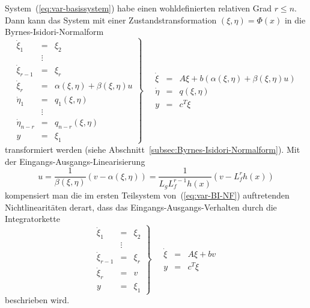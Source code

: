 System~(\ref{eq:var-basissystem}) habe einen wohldefinierten relativen
Grad $r\leq n$. Dann kann das System mit einer Zustandstransformation
$(\xi,\eta)=\Phi(x)$ in die Byrnes-Isidori-Normalform
\begin{equation}
\left.\begin{array}{lcl}
\dot{\xi}_{1} & = & \xi_{2}\\
 & \vdots\\
\dot{\xi}_{r-1} & = & \xi_{r}\\
\dot{\xi}_{r} & = & \alpha(\xi,\eta)+\beta(\xi,\eta)u\\
\dot{\eta}_{1} & = & q_{1}(\xi,\eta)\\
 & \vdots\\
\dot{\eta}_{n-r} & = & q_{n-r}(\xi,\eta)\\
y & = & \xi_{1}
\end{array}\right\} \quad\begin{array}{rcl}
\dot{\xi} & = & A\xi+b(\alpha(\xi,\eta)+\beta(\xi,\eta)u)\\
\dot{\eta} & = & q(\xi,\eta)\\
y & = & c^{T}\xi
\end{array}\label{eq:var-BI-NF}
\end{equation}
transformiert werden (siehe Abschnitt~\ref{subsec:Byrnes-Isidori-Normalform}).
Mit der Eingangs-Ausgangs-Linearisierung 
\begin{equation}
u=\frac{1}{\beta(\xi,\eta)}\left(v-\alpha(\xi,\eta)\right)=\frac{1}{L_{g}L_{f}^{r-1}h(x)}\left(v-L_{f}^{r}h(x)\right)\label{eq:var-linearisierung-FB}
\end{equation}
kompensiert man die im ersten Teilsystem von~(\ref{eq:var-BI-NF})
auftretenden Nichtlinearitäten derart, dass das Eingangs-Ausgangs-Verhalten
durch die Integratorkette
\begin{equation}
\left.\begin{array}{lcl}
\dot{\xi}_{1} & = & \xi_{2}\\
 & \vdots\\
\dot{\xi}_{r-1} & = & \xi_{r}\\
\dot{\xi}_{r} & = & v\\
y & = & \xi_{1}
\end{array}\right\} \quad\begin{array}{rcl}
\dot{\xi} & = & A\xi+bv\\
y & = & c^{T}\xi
\end{array}\label{eq:var-TS1-EA-linearisiert}
\end{equation}
beschrieben wird.

